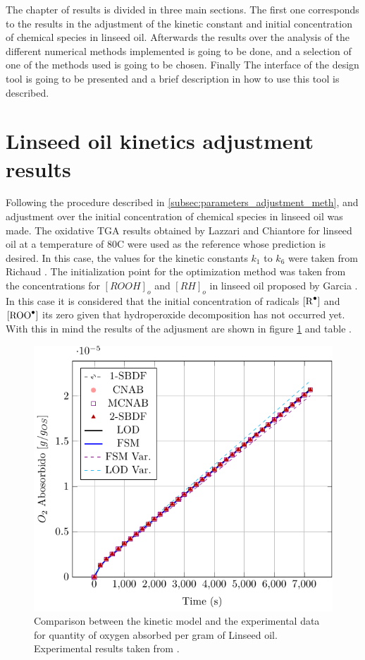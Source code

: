 The chapter of results is divided in three main sections. The first one corresponds to the results in the adjustment of the kinetic constant and initial concentration of chemical species in linseed oil. Afterwards  the results over the analysis of the different numerical methods implemented is going to be done, and a selection of one of the methods used is going to be chosen. Finally The interface of the design tool is going to be presented and a brief description in how to use this tool is described.  


\section{Linseed oil kinetics adjustment results}
Following the procedure described in \ref{subsec:parameters_adjustment_meth}, and adjustment over the initial concentration of chemical species in linseed oil was made.  The oxidative TGA results obtained by  Lazzari and Chiantore \cite{lazzari1999drying}  for linseed oil at a temperature of 80\degree C were used as the reference whose prediction is desired. In this case, the values for the kinetic constants $k_1$  to $k_6$  were taken from Richaud \cite{Richaud2012RateChemiluminescence}. The initialization point for the optimization method was taken from the concentrations for $[ROOH]_o$ and  $[RH]_o$  in linseed oil proposed by Garcia \cite{GarciaMora2015KineticScavengers}. In this case it is considered that the initial concentration of radicals $[\ce{R^.}]$ and $[\ce{ROO^.}]$ its zero given that hydroperoxide decomposition has not occurred yet. With this in mind the results of the adjusment are shown in figure \ref{fig:ajuste_1_cinetica} and table .

\begin{figure}[H]
    \centering
    \includegraphics[width=0.56\linewidth,page=4]{Documento_Latex/Imagenes/rozogafas.pdf}
    \caption{Comparison between the kinetic model and the experimental data for quantity of oxygen absorbed per gram of Linseed oil. Experimental results taken from \cite{lazzari1999drying}.}
    \label{fig:ajuste_1_cinetica}
\end{figure}

